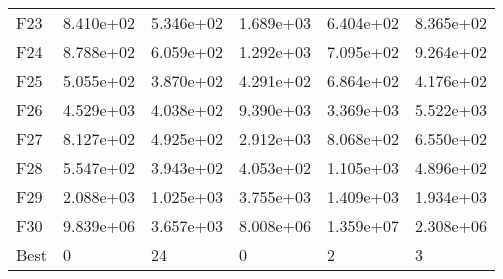 \begin{tabular}{llllll}
F23  &  8.410e+02 &  5.346e+02 &  1.689e+03 &  6.404e+02 &  8.365e+02 \\
F24  &  8.788e+02 &  6.059e+02 &  1.292e+03 &  7.095e+02 &  9.264e+02 \\
F25  &  5.055e+02 &  3.870e+02 &  4.291e+02 &  6.864e+02 &  4.176e+02 \\
F26  &  4.529e+03 &  4.038e+02 &  9.390e+03 &  3.369e+03 &  5.522e+03 \\
F27  &  8.127e+02 &  4.925e+02 &  2.912e+03 &  8.068e+02 &  6.550e+02 \\
F28  &  5.547e+02 &  3.943e+02 &  4.053e+02 &  1.105e+03 &  4.896e+02 \\
F29  &  2.088e+03 &  1.025e+03 &  3.755e+03 &  1.409e+03 &  1.934e+03 \\
F30  &  9.839e+06 &  3.657e+03 &  8.008e+06 &  1.359e+07 &  2.308e+06 \\
Best &          0 &         24 &          0 &          2 &          3 \\
\bottomrule
\end{tabular}
